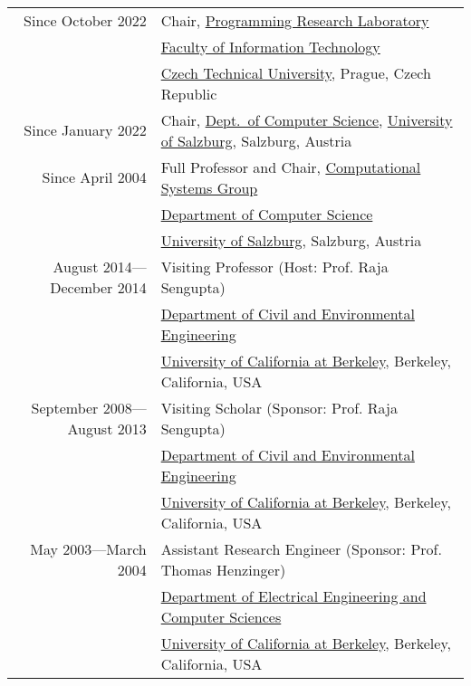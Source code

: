  \\
\begin{tabular}{rl}
Since October 2022 & Chair, \href{https://prl-prg.github.io}{Programming Research Laboratory} \\
                 & \href{https://fit.cvut.cz}{Faculty of Information Technology} \\
                 & \href{https://cvut.cz}{Czech Technical University}, Prague, Czech Republic \\
\noalign{\smallskip}
Since January 2022 & Chair, \href{https://informatik.uni-salzburg.at}{Dept.~of Computer Science}, \href{https://plus.ac.at}{University of Salzburg}, Salzburg, Austria \\
\noalign{\smallskip}
Since April 2004 & Full Professor and Chair, \href{https://www.cs.uni-salzburg.at/~ck}{Computational Systems Group} \\
                 & \href{https://informatik.uni-salzburg.at}{Department of Computer Science} \\
                 & \href{https://plus.ac.at}{University of Salzburg}, Salzburg, Austria \\
\noalign{\smallskip}
August 2014---December 2014 & Visiting Professor (Host: Prof. Raja Sengupta)\\
                            & \href{http://www.ce.berkeley.edu}{Department of Civil and Environmental Engineering} \\
                            & \href{http://www.berkeley.edu}{University of California at Berkeley}, Berkeley, California, USA \\
\noalign{\smallskip}
September 2008---August 2013 & Visiting Scholar (Sponsor: Prof. Raja Sengupta)\\
                             & \href{http://www.ce.berkeley.edu}{Department of Civil and Environmental Engineering} \\
                             & \href{http://www.berkeley.edu}{University of California at Berkeley}, Berkeley, California, USA \\
\noalign{\smallskip}
May 2003---March 2004 & Assistant Research Engineer (Sponsor: Prof. Thomas Henzinger)\\
                      & \href{http://www.eecs.berkeley.edu}{Department of Electrical Engineering and Computer Sciences} \\
                      & \href{http://www.berkeley.edu}{University of California at Berkeley}, Berkeley, California, USA \\

\end{tabular}
